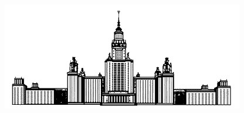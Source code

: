 \documentclass[a4paper]{article}
\begin{document}
\vfill

\begin{figure}[h]
\center
\includegraphics[scale=0.4]{msu2.jpg}
\end{figure}

\thispagestyle{empty}

\clearpage
\end{document}
